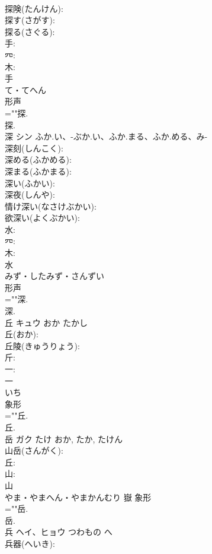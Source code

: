 \documentclass[8pt]{extreport}
\begin{document}
\begin{CJK}{UTF8}{min}
\\	探険(たんけん): 
\\	探す(さがす): 
\\	探る(さぐる): 
\\	手: 
\\	㓁: 
\\	木: 
\\	手	
\\	て・てへん	
\\	形声 
\\	=""探.
\\	探.
\\	深	シン	ふか.い、-ぶか.い、ふか.まる、ふか.める、み-		
\\	深刻(しんこく): 
\\	深める(ふかめる): 
\\	深まる(ふかまる): 
\\	深い(ふかい): 
\\	深夜(しんや): 
\\	情け深い(なさけぶかい): 
\\	欲深い(よくぶかい): 
\\	水: 
\\	㓁: 
\\	木: 
\\	水	
\\	みず・したみず・さんずい	
\\	形声 
\\	=""深.
\\	深.
\\	丘	キュウ	おか	たかし	
\\	丘(おか): 
\\	丘陵(きゅうりょう): 
\\	斤: 
\\	一: 
\\	一	
\\	いち	
\\	象形 
\\	=""丘.
\\	丘.
\\	岳	ガク	たけ	おか, たか, たけん	
\\	山岳(さんがく): 
\\	丘: 
\\	山: 
\\	山	
\\	やま・やまへん・やまかんむり	嶽	象形 
\\	=""岳.
\\	岳.
\\	兵	ヘイ、ヒョウ	つわもの	へ	
\\	兵器(へいき): 

\end{CJK}
\end{document}
